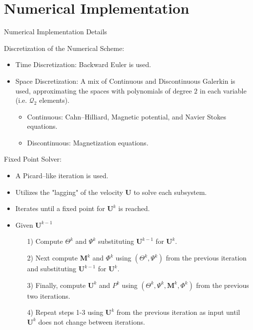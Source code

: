 \documentclass[9pt]{beamer}
\begin{document}
\section{Numerical Implementation}
\begin{frame}{Numerical Implementation Details}

Discretization of the Numerical Scheme:
\begin{itemize}
	\item Time Discretization: Backward Euler is used.
	\item Space Discretization: A mix of Continuous and Discontinuous Galerkin is used, approximating the spaces with polynomials of degree $2$ in each variable (i.e. $\mathcal{Q}_2$ elements).
	\begin{itemize}
		\item Continuous: Cahn--Hilliard, Magnetic potential, and Navier Stokes equations.
		\item Discontinuous: Magnetization equations.
	\end{itemize}
\end{itemize}

Fixed Point Solver:
\begin{itemize}
	\item A Picard--like iteration is used.
	\item Utilizes the "lagging" of the velocity $\mathbf{U}$ to solve each subsystem.
	\item Iterates until a fixed point for $\mathbf{U}^k$ is reached.
	\item Given $\mathbf{U}^{k-1}$ 
	\begin{itemize}
		\item[1)] Compute $\Theta^k$ and $\Psi^k$ substituting $\mathbf{U}^{k-1}$ for $\mathbf{U}^{k}$.
		
		\item[2)] Next compute $\mathbf{M}^k$ and $\Phi^k$ using $(\Theta^k,\Psi^k)$ from the previous iteration and substituting $\mathbf{U}^{k-1}$ for $\mathbf{U}^{k}$.
		
		\item[3)] Finally, compute $\mathbf{U}^k$ and $P^k$ using $(\Theta^k,\Psi^k, \mathbf{M}^k, \Phi^k)$ from the previous two iterations.
		
		\item[4)] Repeat steps 1-3 using $\mathbf{U}^k$ from the previous iteration as input until $\mathbf{U}^k$ does not change between iterations.
	\end{itemize}
\end{itemize}

\end{frame}
\end{document}
